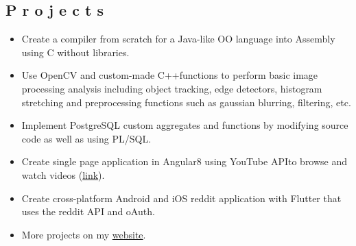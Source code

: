 \documentclass[2pt]{resume}
\begin{document}
\subsection{P r o j e c t s}
\begin{itemize}
\item \small Create a compiler from scratch for a Java-like OO language into Assembly using C without libraries.
\item \small Use OpenCV and custom-made C++functions to perform basic image processing analysis including object tracking, edge detectors, histogram stretching and preprocessing functions such as gaussian blurring, filtering, etc.
\item \small Implement PostgreSQL custom aggregates and functions by modifying source code as well as using PL/SQL.
\item \small Create single page application in Angular8 using YouTube APIto browse and watch videos (\href{https://github.com/mushfiq814/youtube-data-api-dogVids}{link}).
\item \small Create cross-platform Android and iOS reddit application with Flutter that uses the reddit API and oAuth.
\item \small More projects on my \href{https://mushfiqmahmud.com/html/projects}{website}.
\end{itemize}

\end{document}
